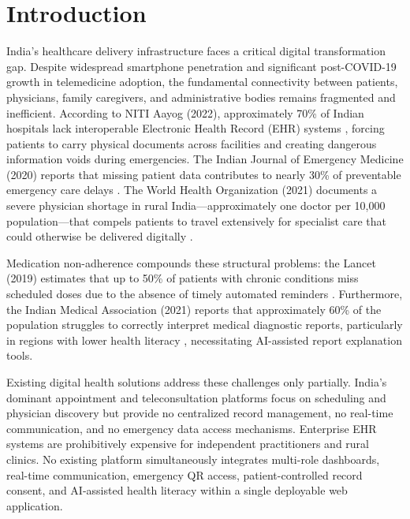 \documentclass[conference]{IEEEtran}
\begin{document}
\section{Introduction}

India's healthcare delivery infrastructure faces a critical digital transformation gap. Despite widespread smartphone penetration and significant post-COVID-19 growth in telemedicine adoption, the fundamental connectivity between patients, physicians, family caregivers, and administrative bodies remains fragmented and inefficient. According to NITI Aayog (2022), approximately 70\% of Indian hospitals lack interoperable Electronic Health Record (EHR) systems \cite{niti2022}, forcing patients to carry physical documents across facilities and creating dangerous information voids during emergencies. The Indian Journal of Emergency Medicine (2020) reports that missing patient data contributes to nearly 30\% of preventable emergency care delays \cite{ijem2020}. The World Health Organization (2021) documents a severe physician shortage in rural India—approximately one doctor per 10,000 population—that compels patients to travel extensively for specialist care that could otherwise be delivered digitally \cite{who2021}.

Medication non-adherence compounds these structural problems: the Lancet (2019) estimates that up to 50\% of patients with chronic conditions miss scheduled doses due to the absence of timely automated reminders \cite{lancet2019}. Furthermore, the Indian Medical Association (2021) reports that approximately 60\% of the population struggles to correctly interpret medical diagnostic reports, particularly in regions with lower health literacy \cite{ima2021}, necessitating AI-assisted report explanation tools.

Existing digital health solutions address these challenges only partially. India's dominant appointment and teleconsultation platforms focus on scheduling and physician discovery but provide no centralized record management, no real-time communication, and no emergency data access mechanisms. Enterprise EHR systems are prohibitively expensive for independent practitioners and rural clinics. No existing platform simultaneously integrates multi-role dashboards, real-time communication, emergency QR access, patient-controlled record consent, and AI-assisted health literacy within a single deployable web application.
\end{document}
